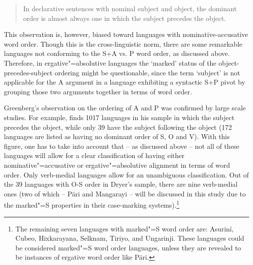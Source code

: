 \begin{quote}
In declarative sentences with nominal subject and object, the dominant order is almost always one in which the subject precedes the object. 
 \citep[61]{Greenberg:1963}
\end{quote}

This observation is, however, biased toward languages with no\-mi\-na\-tive-ac\-cu\-sa\-tive word order.
Though this is the cross-linguistic norm, there are some remarkable languages not conforming to the S+A vs. P word order, as discussed above.
Therefore, in ergative"=absolutive languages the `marked' status of the object-precedes-subject ordering might be questionable, since the term `subject' is not applicable for the A argument in a language exhibiting a syntactic S+P pivot by grouping those two arguments together in terms of word order.

Greenberg's observation on the ordering of A and P was confirmed by large scale studies. 
For example, \citet{WALS81} finds 1017 languages in his sample in which the subject precedes the object, while only 39 have the subject following the object (172 languages are listed as having no dominant order of S, O and V). 
With this figure, one has to take into account that -- as discussed above -- not all of these languages will allow for a clear classification of having either nominative"=accusative or ergative"=absolutive alignment in terms of word order. 
Only verb-medial languages allow for an unambiguous classification. Out of the 39 languages with O-S order in Dryer's sample, there are nine verb-medial ones (two of which -- P\"ari and Mangarayi -- will be discussed in this study due to the marked"=S properties in their case-marking systems).\footnote{The remaining seven languages with marked"=S word order are: Asurin\'i, Cubeo, Hixkarayana, Selknam, Tiriyo, and Ungarinji.  These languages could be considered marked"=S word order languages, unless they are revealed to be instances of ergative word order like P\"ari.}  


